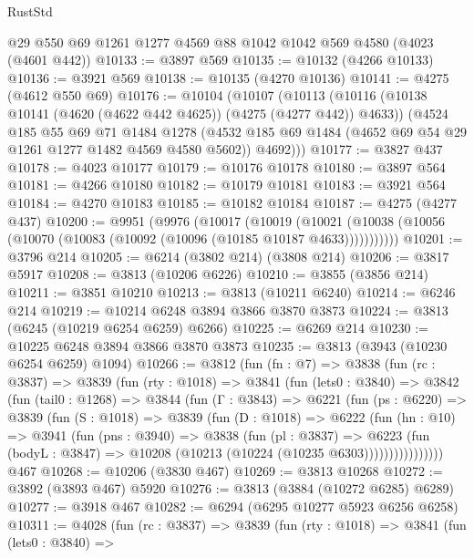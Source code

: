 \begin{lexlean}{RustStd}
\begin{coremodule}
{\begin{coremodule}
{{{{{{{{{{{{{{{{{{{{{{{{{{{{{{{{{{{    @29
    @550
    @69
    @1261
    @1277
    @4569
    @88
    @1042
    @1042
    @569
    @4580
    (@4023 (@4601 @442))
@10133 := @3897 @569
@10135 := @10132 (@4266 @10133)
@10136 := @3921 @569
@10138 := @10135 (@4270 @10136)
@10141 := @4275 (@4612 @550 @69)
@10176 := @10104
    (@10107
      (@10113
        (@10116 (@10138 @10141 (@4620 (@4622 @442 @4625)) (@4275 (@4277 @442)) @4633))
        (@4524
          @185
          @55
          @69
          @71
          @1484
          @1278
          (@4532 @185 @69 @1484 (@4652 @69 @54 @29 @1261 @1277 @1482 @4569 @4580 @5602))
          @4692)))
@10177 := @3827 @437
@10178 := @4023 @10177
@10179 := @10176 @10178
@10180 := @3897 @564
@10181 := @4266 @10180
@10182 := @10179 @10181
@10183 := @3921 @564
@10184 := @4270 @10183
@10185 := @10182 @10184
@10187 := @4275 (@4277 @437)
@10200 := @9951
    (@9976
      (@10017
        (@10019
          (@10021 (@10038 (@10056 (@10070 (@10083 (@10092 (@10096 (@10185 @10187 @4633)))))))))))
@10201 := @3796 @214
@10205 := @6214 (@3802 @214) (@3808 @214)
@10206 := @3817 @5917
@10208 := @3813 (@10206 @6226)
@10210 := @3855 (@3856 @214)
@10211 := @3851 @10210
@10213 := @3813 (@10211 @6240)
@10214 := @6246 @214
@10219 := @10214 @6248 @3894 @3866 @3870 @3873
@10224 := @3813 (@6245 (@10219 @6254 @6259) @6266)
@10225 := @6269 @214
@10230 := @10225 @6248 @3894 @3866 @3870 @3873
@10235 := @3813 (@3943 (@10230 @6254 @6259) @1094)
@10266 := @3812
    (fun (fn : @7) =>
    @3838
      (fun (rc : @3837) =>
      @3839
        (fun (rty : @1018) =>
        @3841
          (fun (lets0 : @3840) =>
          @3842
            (fun (tail0 : @1268) =>
            @3844
              (fun (Γ : @3843) =>
              @6221
                (fun (ps : @6220) =>
                @3839
                  (fun (S : @1018) =>
                  @3839
                    (fun (D : @1018) =>
                    @6222
                      (fun (hn : @10) =>
                      @3941
                        (fun (pns : @3940) =>
                        @3838
                          (fun (pl : @3837) =>
                          @6223
                            (fun (bodyL : @3847) =>
                            @10208 (@10213 (@10224 (@10235 @6303))))))))))))))))
    @467
@10268 := @10206 (@3830 @467)
@10269 := @3813 @10268
@10272 := @3892 (@3893 @467) @5920
@10276 := @3813 (@3884 (@10272 @6285) @6289)
@10277 := @3918 @467
@10282 := @6294 (@6295 @10277 @5923 @6256 @6258)
@10311 := @4028
    (fun (rc : @3837) =>
    @3839
      (fun (rty : @1018) =>
      @3841
        (fun (lets0 : @3840) =>
}}}}}}}}}}}}}}}}}}}}}}}}}}}}}}}}}}}
\end{coremodule}}
\end{coremodule}
\end{lexlean}
